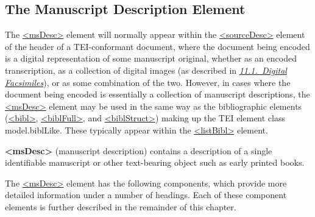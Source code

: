 \subsection[{The Manuscript Description Element}]{The Manuscript Description Element}\label{msdesc}\par
The \hyperref[TEI.msDesc]{<msDesc>} element will normally appear within the \hyperref[TEI.sourceDesc]{<sourceDesc>} element of the header of a TEI-conformant document, where the document being encoded is a digital representation of some manuscript original, whether as an encoded transcription, as a collection of digital images (as described in \textit{\hyperref[PHFAX]{11.1.\ Digital Facsimiles}}), or as some combination of the two. However, in cases where the document being encoded is essentially a collection of manuscript descriptions, the \hyperref[TEI.msDesc]{<msDesc>} element may be used in the same way as the bibliographic elements (\hyperref[TEI.bibl]{<bibl>}, \hyperref[TEI.biblFull]{<biblFull>}, and \hyperref[TEI.biblStruct]{<biblStruct>}) making up the TEI element class \textsf{model.biblLike}. These typically appear within the \hyperref[TEI.listBibl]{<listBibl>} element. 
\begin{sansreflist}
  
\item [\textbf{<msDesc>}] (manuscript description) contains a description of a single identifiable manuscript or other text-bearing object such as early printed books.
\end{sansreflist}
\par
The \hyperref[TEI.msDesc]{<msDesc>} element has the following components, which provide more detailed information under a number of headings. Each of these component elements is further described in the remainder of this chapter. 
